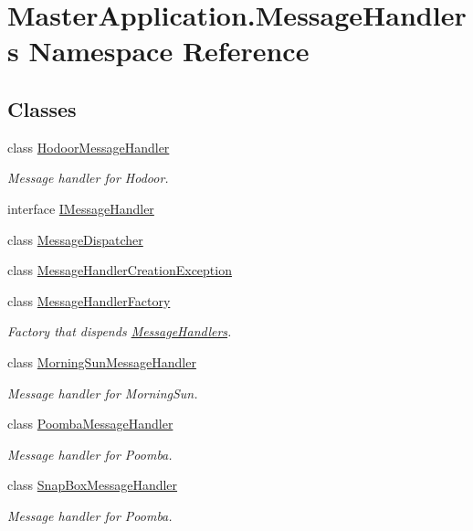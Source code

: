 \hypertarget{namespace_master_application_1_1_message_handlers}{}\section{Master\+Application.\+Message\+Handlers Namespace Reference}
\label{namespace_master_application_1_1_message_handlers}
\subsection*{Classes}
\begin{DoxyCompactItemize}
\item 
class \mbox{\hyperlink{class_master_application_1_1_message_handlers_1_1_hodoor_message_handler}{Hodoor\+Message\+Handler}}
\begin{DoxyCompactList}\small\item\em Message handler for Hodoor. \end{DoxyCompactList}\item 
interface \mbox{\hyperlink{interface_master_application_1_1_message_handlers_1_1_i_message_handler}{I\+Message\+Handler}}
\item 
class \mbox{\hyperlink{class_master_application_1_1_message_handlers_1_1_message_dispatcher}{Message\+Dispatcher}}
\item 
class \mbox{\hyperlink{class_master_application_1_1_message_handlers_1_1_message_handler_creation_exception}{Message\+Handler\+Creation\+Exception}}
\item 
class \mbox{\hyperlink{class_master_application_1_1_message_handlers_1_1_message_handler_factory}{Message\+Handler\+Factory}}
\begin{DoxyCompactList}\small\item\em Factory that dispends \mbox{\hyperlink{namespace_master_application_1_1_message_handlers}{Message\+Handlers}}. \end{DoxyCompactList}\item 
class \mbox{\hyperlink{class_master_application_1_1_message_handlers_1_1_morning_sun_message_handler}{Morning\+Sun\+Message\+Handler}}
\begin{DoxyCompactList}\small\item\em Message handler for Morning\+Sun. \end{DoxyCompactList}\item 
class \mbox{\hyperlink{class_master_application_1_1_message_handlers_1_1_poomba_message_handler}{Poomba\+Message\+Handler}}
\begin{DoxyCompactList}\small\item\em Message handler for Poomba. \end{DoxyCompactList}\item 
class \mbox{\hyperlink{class_master_application_1_1_message_handlers_1_1_snap_box_message_handler}{Snap\+Box\+Message\+Handler}}
\begin{DoxyCompactList}\small\item\em Message handler for Poomba. \end{DoxyCompactList}\end{DoxyCompactItemize}

